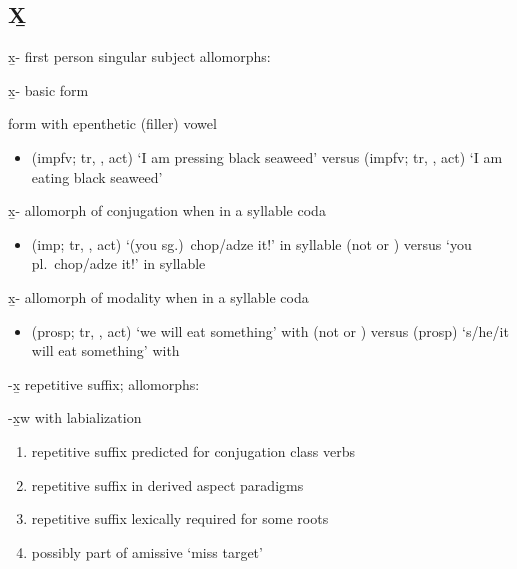 \subsection{X̱}\label{sec:alphalist-xh}
\begin{morphdesc}[resume*=alphalist]
\item[x̱-]\label{m:x̱-1sg}
	first person singular subject
	\newline
	allomorphs:
	\begin{allolist}
	\item[x̱-]	basic form
	\item[\X{x̱a-}]	form with epenthetic (filler) vowel 
	\end{allolist}
	\begin{itemize}
	\item	{} (impfv; tr, ,  act) ‘I am pressing black seaweed’\newline
		versus  (impfv; tr, ,  act) ‘I am eating black seaweed’
	\end{itemize}

\item[x̱-]\label{m:x̱-g̱cnj}
	allomorph of conjugation  when in a syllable coda
	\begin{itemize}
	\item	{} (imp; tr, ,  act) ‘(you sg.)\ chop/adze it!’ in syllable \newline
		(not  or )\newline
		versus  ‘you pl.\ chop/adze it!’ in syllable \fm{g̱ay}
	\end{itemize}

\item[x̱-]\label{m:x̱-mod}
	allomorph of modality  when in a syllable coda
	\begin{itemize}
	\item	{} (prosp; tr, ,  act) ‘we will eat something’ with \newline
		(not  or )\newline
		versus  (prosp) ‘s/he/it will eat something’ with \fm{g̱a-}
	\end{itemize}

\item[-x̱]\label{m:-x̱}
	repetitive suffix;
	\newline
	allomorphs:
	\begin{allolist}
	\item[-x̱w]	with labialization
	\end{allolist}
	\begin{enumerate}
	\item	repetitive suffix predicted for  conjugation class verbs
	\item	repetitive suffix in derived aspect paradigms
	\item	repetitive suffix lexically required for some roots
	\item	possibly part of amissive  ‘miss target’
	\end{enumerate}


\end{morphdesc}
